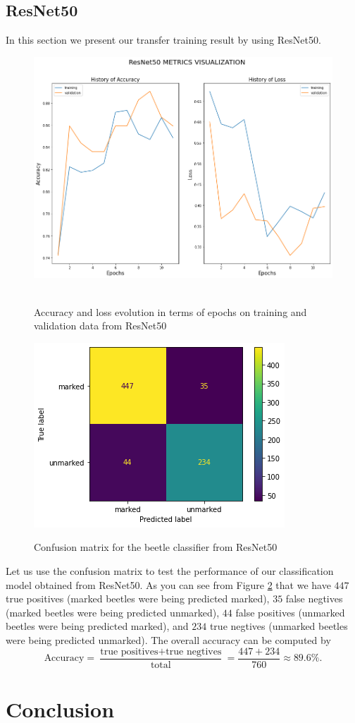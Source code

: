 \documentclass[11pt]{m2pi_v2}
\begin{document}
\subsection{ResNet50}
In this section we present our transfer training result by using ResNet50.
\begin{figure}
	\includegraphics[scale=0.4]{accuresnet.png}\,
	\caption{Accuracy and loss evolution in terms of epochs on training and validation data from ResNet50}\label{resaccu}
\end{figure}
\begin{figure}
	\includegraphics[scale=0.9]{cmresnet.png}\,
	\caption{Confusion matrix for the beetle classifier from ResNet50}\label{rescm}
\end{figure}
Let us use the confusion matrix to test the performance of our classification model obtained from ResNet50. As you can see from Figure \ref{rescm} that we have $447$ true positives (marked beetles were being predicted marked), $35$ false negtives (marked beetles were being predicted unmarked), $44$ false positives (unmarked beetles were being predicted marked), and $234$ true negtives (unmarked beetles were being predicted unmarked). The overall accuracy can be computed by
\begin{equation*}
\mbox{Accuracy}=\frac{\mbox{true positives}+\mbox{true negtives}}{\mbox{total}}=\frac{447+234}{760}\approx 89.6\%.
\end{equation*}



\newpage
\section{Conclusion}






\nocite{*}

\newpage



\newpage
\end{document}
